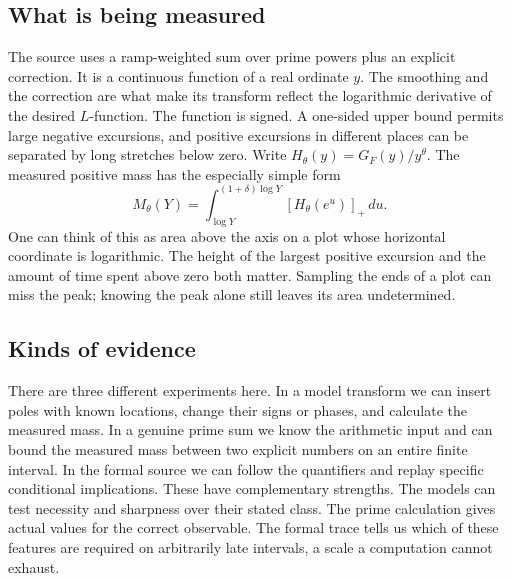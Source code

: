 \documentclass[12pt,letterpaper]{article}
\begin{document}
\subsection{What is being measured}
The source uses a ramp-weighted sum over prime powers plus an explicit correction. It is a continuous function of a real ordinate \(y\). The smoothing and the correction are what make its transform reflect the logarithmic derivative of the desired \(L\)-function. The function is signed. A one-sided upper bound permits large negative excursions, and positive excursions in different places can be separated by long stretches below zero. Write \(H_\theta(y)=G_F(y)/y^\theta\). The measured positive mass has the especially simple form
\[
 M_\theta(Y)=\int_{\log Y}^{(1+\delta)\log Y}
                  [H_\theta(e^u)]_+\,du .
\]
One can think of this as area above the axis on a plot whose horizontal coordinate is logarithmic. The height of the largest positive excursion and the amount of time spent above zero both matter. Sampling the ends of a plot can miss the peak; knowing the peak alone still leaves its area undetermined.

\subsection{Kinds of evidence}
There are three different experiments here. In a model transform we can insert poles with known locations, change their signs or phases, and calculate the measured mass. In a genuine prime sum we know the arithmetic input and can bound the measured mass between two explicit numbers on an entire finite interval. In the formal source we can follow the quantifiers and replay specific conditional implications. These have complementary strengths. The models can test necessity and sharpness over their stated class. The prime calculation gives actual values for the correct observable. The formal trace tells us which of these features are required on arbitrarily late intervals, a scale a computation cannot exhaust.
\end{document}
